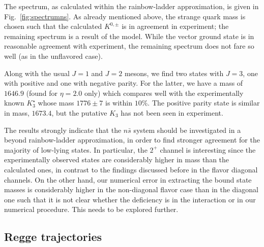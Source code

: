 The spectrum, as calculated within the rainbow-ladder approximation, is given in Fig.~\ref{fig:spectrumns}. 
As already mentioned above, the strange quark mass is chosen such that the calculated $K^{0,\pm}$ 
is in agreement in experiment; the remaining spectrum is a result of the model.
While the vector ground state is in reasonable agreement with experiment, the remaining spectrum 
does not fare so well (as in the unflavored case).

Along with the usual $J=1$ and $J=2$ mesons, we find two states with $J=3$, one with positive 
and one with negative parity. For the latter, we have a mass of $1646.9$ (found for $\eta=2.0$ only) 
which compares well with the experimentally known $K_3^\star$ whose mass $1776\pm7$ is within $10\%$. 
The positive parity state is similar in mass, $1673.4$, but the putative $K_3$ has not been seen in 
experiment. 

The results strongly indicate that the $n\bar{s}$ system should be investigated in a beyond rainbow-ladder 
approximation, in order to find stronger agreement for the majority of low-lying states. In particular, the
$2^+$ channel is interesting since the experimentally observed states are considerably higher in mass than 
the calculated ones, in contrast to the findings discussed before in the flavor diagonal channels. On the
other hand, our numerical error in extracting the bound state masses is considerably higher in the
non-diagonal flavor case than in the diagonal one such that it is not clear whether the deficiency is in the
interaction or in our numerical procedure. This needs to be explored further.

%
%
%
%
%
\subsection{Regge trajectories}\label{res:regge}

